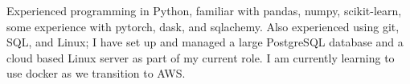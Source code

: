 \documentclass[a4paper]{article}
\begin{document}
Experienced programming in Python, familiar with pandas, numpy, scikit-learn, some experience with pytorch, dask, and sqlachemy. Also experienced using git, SQL, and Linux; I have set up and managed a large PostgreSQL database and a cloud based Linux server as part of my current role. I am currently learning to use docker as we transition to AWS.

%
%
%
%
%
%
%
%
\end{document}
